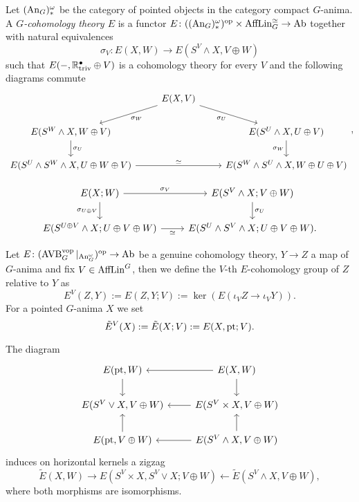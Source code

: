 \begin{definition}
Let $(\operatorname{An}_G)^\omega_*$ be the category of pointed objects in the category compact $G$-anima.
A \emph{$G$-cohomology theory $E$} is a functor $E \colon ((\operatorname{An}_G)^\omega_*)^{\mathrm{op}} \times \operatorname{AffLin}_G^\simeq \to \mathrm{Ab}$
together with natural equivalences 
\[
    \sigma_V \colon E(X,W) \to E(S^V \wedge X, V \oplus W)
\]
such that 
$E(-, \mathbb{R}^\bullet_{\mathrm{triv}} \oplus V)$ is a cohomology theory for every $V$ and the following diagrams commute
\[\begin{tikzcd}
	& {E(X,V)} \\
	{E(S^W\wedge X,W\oplus V)} && {E(S^U\wedge X, U \oplus V)} \\
	{E(S^U\wedge S^W \wedge X, U \oplus W \oplus V)} && {E(S^W \wedge S^U \wedge X, W \oplus U \oplus V)}
	\arrow["{\sigma_W}", from=1-2, to=2-1]
	\arrow["{\sigma_U}"', from=1-2, to=2-3]
	\arrow["{\sigma_U}", from=2-1, to=3-1]
	\arrow["{\sigma_W}"', from=2-3, to=3-3]
	\arrow["\simeq", from=3-1, to=3-3]
\end{tikzcd},\]

\[\begin{tikzcd}
	{E(X;W)} & {E(S^V \wedge X; V \oplus W)} \\
	{E(S^{U \oplus V} \wedge X; U \oplus V \oplus W)} & {E(S^U \wedge S^V \wedge X;U \oplus V \oplus W)}
	\arrow["{\sigma_V}", from=1-1, to=1-2]
	\arrow["\simeq"', from=2-1, to=2-2]
	\arrow["{\sigma_U}", from=1-2, to=2-2]
	\arrow["{\sigma_{U\oplus V}}"', from=1-1, to=2-1].
\end{tikzcd}\]


\end{definition}

\begin{definition}
    Let $E \colon (\operatorname{AVB}^{\mathrm{vop}}_G|_{\operatorname{An}_G^\omega})^{\mathrm{op}} \to \mathrm{Ab}$ be a genuine cohomology theory, $Y \to Z$ a map of $G$-anima and fix $V \in \operatorname{AffLin}^G$, then we define 
    the $V$-th $E$-cohomology group of $Z$ relative to $Y$ as
    \[
      E^V(Z,Y) := E(Z,Y;V) := \ker ( E(\iota_V Z \to \iota_V Y)). 
    \]
    For a pointed $G$-anima $X$ we set 
    \[
      \tilde E^V(X) := \tilde E(X;V) := E(X, \mathrm{pt}; V).
    \]
\end{definition}
\begin{lemma}

    The diagram 
    \[\begin{tikzcd}
        {E(\pt, W)} & {E(X,W)} \\
        {E(S^V\vee X,V \oplus W)} & {E(S^V \times X, V \oplus W)} \\
        {E(\pt, V \oplus W)} & {E(S^V \wedge X, V \oplus W)}
        \arrow[from=1-2, to=1-1]
        \arrow[from=1-1, to=2-1]
        \arrow[from=2-2, to=2-1]
        \arrow[from=1-2, to=2-2]
        \arrow[from=3-2, to=2-2]
        \arrow[from=3-1, to=2-1]
        \arrow[from=3-2, to=3-1]
    \end{tikzcd}\]
    induces on horizontal kernels a zigzag 
    \[
    \tilde E(X,W) \to E(S^V \times X, S^V \vee X ; V \oplus W) \leftarrow \tilde E(S^V \wedge X, V \oplus W),
    \]
    where both morphisms are isomorphisms.
\end{lemma}

